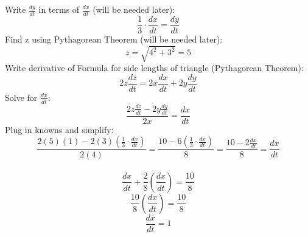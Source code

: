 \documentclass[12pt,letterpaper, onecolumn]{exam}
\begin{document}
\begin{questions}
		\begin{solution}
			Write $\frac{dy}{dt}$ in terms of $\frac{dx}{dt}$ (will be needed later):
			$$\frac{1}{3} \cdot \frac{dx}{dt} = \frac{dy}{dt}$$
			Find z using Pythagorean Theorem (will be needed later):
			$$z = \sqrt{4^2+3^2} = 5$$
			Write derivative of Formula for side lengths of triangle (Pythagorean Theorem):
			$$2z\frac{dz}{dt}=2x\frac{dx}{dt} + 2y\frac{dy}{dt}$$
			Solve for $\frac{dx}{dt}$:
			$$\frac{2z\frac{dz}{dt} - 2y\frac{dy}{dt}} {2x} = \frac{dx}{dt}$$
			Plug in knowns and simplify:
			$$\frac{2(5)(1) - 2(3)(\frac{1}{3} \cdot \frac{dx}{dt})} {2(4)} = \frac{10 - 6\left( \frac{1}{3} \cdot \frac{dx}{dt}\right) } {8} =  \frac{10 - 2\frac{dx}{dt}}{8} = \frac{dx}{dt}$$ \\
			$$\frac{dx}{dt} + \frac{2}{8} \left( \frac{dx}{dt}\right)  = \frac{10}{8}$$
			$$\frac{10}{8} \left( \frac{dx}{dt}\right)  = \frac{10}{8}$$
			$$\boxed{\frac{dx}{dt} = 1}$$
		\end{solution}
		

\end{questions}
\end{document}
